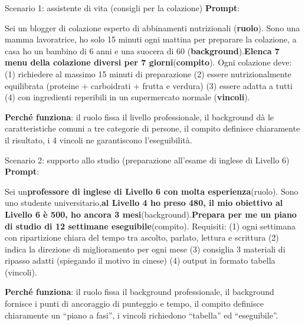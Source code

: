 \begin{tcbinfo}{Scenario 1: assistente di vita (consigli per la colazione)}
\textbf{Prompt}:

Sei un blogger di colazione esperto di abbinamenti nutrizionali (\textbf{ruolo}). Sono una mamma lavoratrice, ho solo 15 minuti ogni mattina per preparare la colazione, a casa ho un bambino di 6 anni e una suocera di 60 (\textbf{background}).\textbf{Elenca 7 menu della colazione diversi per 7 giorni}(\textbf{compito}). Ogni colazione deve: (1) richiedere al massimo 15 minuti di preparazione (2) essere nutrizionalmente equilibrata (proteine + carboidrati + frutta e verdura) (3) essere adatta a tutti (4) con ingredienti reperibili in un supermercato normale (\textbf{vincoli}).

\textbf{Perché funziona}: il ruolo fissa il livello professionale, il background dà le caratteristiche comuni a tre categorie di persone, il compito definisce chiaramente il risultato, i 4 vincoli ne garantiscono l'eseguibilità.

\end{tcbinfo}

\begin{tcbinfo}{Scenario 2: supporto allo studio (preparazione all'esame di inglese di Livello 6)}
\textbf{Prompt}:

Sei un\textbf{professore di inglese di Livello 6 con molta esperienza}(ruolo). Sono uno studente universitario,\textbf{al Livello 4 ho preso 480, il mio obiettivo al Livello 6 è 500, ho ancora 3 mesi}(background).\textbf{Prepara per me un piano di studio di 12 settimane eseguibile}(compito). Requisiti: (1) ogni settimana con ripartizione chiara del tempo tra ascolto, parlato, lettura e scrittura (2) indica la direzione di miglioramento per ogni mese (3) consiglia 3 materiali di ripasso adatti (spiegando il motivo in cinese) (4) output in formato tabella (vincoli).

\textbf{Perché funziona}: il ruolo fissa il background professionale, il background fornisce i punti di ancoraggio di punteggio e tempo, il compito definisce chiaramente un “piano a fasi”, i vincoli richiedono “tabella” ed “eseguibile”.

\end{tcbinfo}

